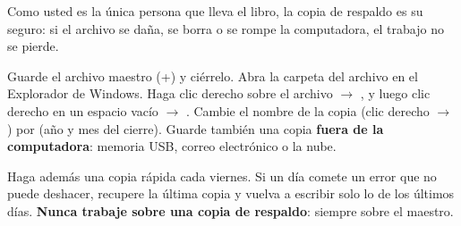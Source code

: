 Como usted es la única persona que lleva el libro, la copia de respaldo es su seguro: si el archivo se daña, se borra o se rompe la computadora,
el trabajo no se pierde.

\begin{pasos}
\paso Guarde el archivo maestro (+) y ciérrelo.
\paso Abra la carpeta del archivo en el Explorador de Windows. Haga clic derecho sobre el archivo $\rightarrow$ , y luego clic derecho en
      un espacio vacío $\rightarrow$ .
\paso Cambie el nombre de la copia (clic derecho $\rightarrow$ ) por 
      (año y mes del cierre).
\paso Guarde también una copia \textbf{fuera de la computadora}: memoria USB, correo electrónico o la nube.
\end{pasos}

\begin{consejo}
Haga además una copia rápida cada viernes. Si un día comete un error que no puede deshacer, recupere la última copia y vuelva a escribir solo lo de
los últimos días. \textbf{Nunca trabaje sobre una copia de respaldo}: siempre sobre el maestro.
\end{consejo}
